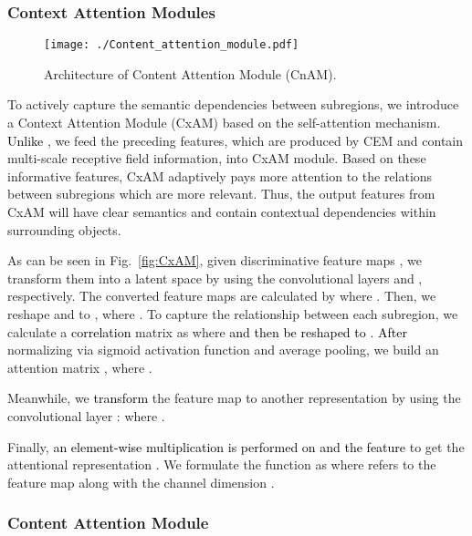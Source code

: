 \documentclass[journal]{IEEEtran}
\def\myblue{\textcolor{black}}
\begin{document}
	\subsubsection{Context Attention Modules}\label{CxAM}
	

	\begin{figure}[t]
		\begin{center}
\texttt{[image: ./Content\_attention\_module.pdf]}
		\end{center}
\caption{Architecture of Content Attention Module (CnAM).}
\label{fig:CnAM}
	\end{figure}

	
	To actively capture the semantic dependencies between subregions,
we introduce a Context Attention Module (CxAM) based on the self-attention mechanism. \myblue{Unlike} \cite{fu2018dual}, we feed the preceding features, which are produced by CEM and contain multi-scale receptive field information, into CxAM module. Based on these informative features, CxAM adaptively pays more attention to the relations between subregions which are more relevant. Thus, the output features from CxAM will have clear semantics and contain contextual dependencies within surrounding objects.
	
	As can be seen in Fig.~\ref{fig:CxAM}, given discriminative feature maps , we transform them into a latent space by using the convolutional layers  and , respectively. The converted feature maps are calculated by 
	{
		}where . Then, we reshape  and  to , where . To capture the relationship between each subregion, we calculate a \myblue{correlation} matrix as
	{
}where  \myblue{and then be reshaped to .}
\myblue{After} normalizing  via sigmoid activation function and average pooling, we build an attention matrix , where .


	Meanwhile, we \myblue{transform} the feature map  to another representation  by using the convolutional layer :
	{
}where .


	Finally, 
\myblue{an element-wise multiplication is performed on  and the feature }
	to get the attentional representation . We formulate the function as
	{
		}where  refers to the  feature map along with the channel dimension .




	

	
	
	\subsubsection{Content Attention Module}
	
\end{document}
